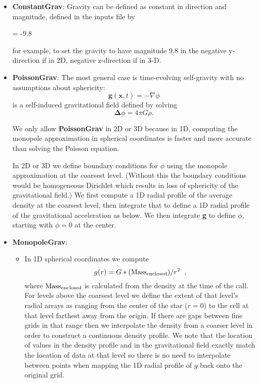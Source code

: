 \begin{itemize}
\item {\bf ConstantGrav}: Gravity can be defined as constant in direction and magnitude, 
defined in the inputs file by 

 = -9.8

for example, to set the gravity to have magnitude 9.8 in the 
negative y-direction if in 2D, negative z-direction if in 3-D.

\item {\bf PoissonGrav}: 
The most general case is time-evolving self-gravity with no assumptions about sphericity:
\begin{equation}
\mathbf{g}(\mathbf{x},t) = -\nabla \phi 
\end{equation}
is a self-induced gravitational field defined by solving
\begin{equation}
\mathbf{\Delta} \phi = 4 \pi G \rho .\label{eq:Self Gravity}
\end{equation}

We only allow {\bf PoissonGrav} in 2D or 3D because in 1D, computing the monopole 
approximation in spherical coordinates is faster and more accurate than solving
the Poisson equation.

In 2D or 3D we define boundary conditions for $\phi$ using the monopole approximation
at the coarsest level.  (Without this the boundary conditions would be homogeneous
Dirichlet which results in loss of sphericity of the gravitational field.)  We first
compute a 1D radial profile of the average density at the coarsest level, then integrate
that to define a 1D radial profile of the gravitational acceleration as below.  We
then integrate {\bf g} to define $\phi,$ starting with $\phi = 0$ at the center.

\item {\bf MonopoleGrav}: 
\begin{itemize}

\item In 1D spherical coordinates we compute 
\[g(r) = G * ({\rm Mass_{enclosed}}) / r^2 \; \; , \]
where ${\rm Mass_{enclosed}}$ is calculated from the density at the time of the call. 
For levels above the coarsest level we define the extent of that level's radial arrays 
as ranging from the center of the star ($r=0$) to the cell at that level farthest away from the
origin.  If there are gaps between fine grids in that range then we interpolate the density
from a coarser level in order to construct a continuous density profile.  We note that
the location of values in the density profile and in the gravitational field exactly match the
location of data at that level so there is no need to interpolate between points when
mapping the 1D radial profile of $g$ back onto the original grid.


\end{itemize}
\end{itemize}
